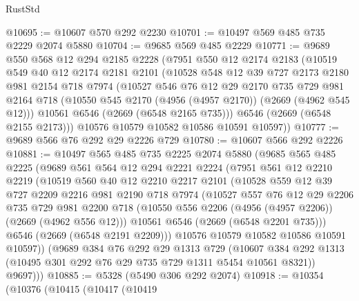 \begin{lexlean}{RustStd}
\begin{coremodule}
@10695 := @10607 @570 @292 @2230
@10701 := @10497 @569 @485 @735 @2229 @2074 @5880
@10704 := @9685 @569 @485 @2229
@10771 := @9689
    @550
    @568
    @12
    @294
    @2185
    @2228
    (@7951
      @550
      @12
      @2174
      @2183
      (@10519
        @549
        @40
        @12
        @2174
        @2181
        @2101
        (@10528
          @548
          @12
          @39
          @727
          @2173
          @2180
          @981
          @2154
          @718
          @7974
          (@10527
            @546
            @76
            @12
            @29
            @2170
            @735
            @729
            @981
            @2164
            @718
            (@10550 @545 @2170 (@4956 (@4957 @2170)) (@2669 (@4962 @545 @12)))
            @10561
            @6546
            (@2669 (@6548 @2165 @735)))
          @6546
          (@2669 (@6548 @2155 @2173)))
        @10576
        @10579
        @10582
        @10586
        @10591
        @10597))
@10777 := @9689 @566 @76 @292 @29 @2226 @729
@10780 := @10607 @566 @292 @2226
@10881 := @10497
    @565
    @485
    @735
    @2225
    @2074
    @5880
    (@9685
      @565
      @485
      @2225
      (@9689
        @561
        @564
        @12
        @294
        @2221
        @2224
        (@7951
          @561
          @12
          @2210
          @2219
          (@10519
            @560
            @40
            @12
            @2210
            @2217
            @2101
            (@10528
              @559
              @12
              @39
              @727
              @2209
              @2216
              @981
              @2190
              @718
              @7974
              (@10527
                @557
                @76
                @12
                @29
                @2206
                @735
                @729
                @981
                @2200
                @718
                (@10550 @556 @2206 (@4956 (@4957 @2206)) (@2669 (@4962 @556 @12)))
                @10561
                @6546
                (@2669 (@6548 @2201 @735)))
              @6546
              (@2669 (@6548 @2191 @2209)))
            @10576
            @10579
            @10582
            @10586
            @10591
            @10597))
        (@9689
          @384
          @76
          @292
          @29
          @1313
          @729
          (@10607 @384 @292 @1313 (@10495 @301 @292 @76 @29 @735 @729 @1311 @5454 @10561 @8321))
          @9697)))
@10885 := @5328 (@5490 @306 @292 @2074)
@10918 := @10354
    (@10376
      (@10415
        (@10417
          (@10419

\end{coremodule}
\end{lexlean}
